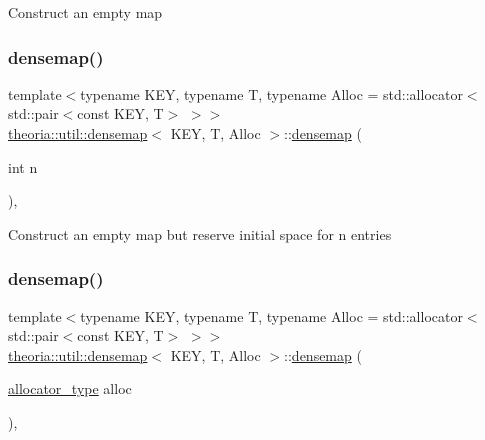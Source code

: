Construct an empty map \mbox{\label{classtheoria_1_1util_1_1densemap_a28dea7cc32d7cee72cf330bdf3e3201c}} 
\subsubsection{\texorpdfstring{densemap()}{densemap()}\hspace{0.1cm}{\footnotesize\ttfamily [2/7]}}
{\footnotesize\ttfamily template$<$typename K\+EY, typename T, typename Alloc = std\+::allocator$<$std\+::pair$<$const K\+E\+Y, T$>$ $>$$>$ \\
\hyperlink{classtheoria_1_1util_1_1densemap}{theoria\+::util\+::densemap}$<$ K\+EY, T, Alloc $>$\+::\hyperlink{classtheoria_1_1util_1_1densemap}{densemap} (\begin{DoxyParamCaption}\item[{int}]{n }\end{DoxyParamCaption})\hspace{0.3cm}{\ttfamily [inline]}, {\ttfamily [explicit]}}

Construct an empty map but reserve initial space for n entries \mbox{\label{classtheoria_1_1util_1_1densemap_a4c32897f404f44c7de730637d09e18d5}} 
\subsubsection{\texorpdfstring{densemap()}{densemap()}\hspace{0.1cm}{\footnotesize\ttfamily [3/7]}}
{\footnotesize\ttfamily template$<$typename K\+EY, typename T, typename Alloc = std\+::allocator$<$std\+::pair$<$const K\+E\+Y, T$>$ $>$$>$ \\
\hyperlink{classtheoria_1_1util_1_1densemap}{theoria\+::util\+::densemap}$<$ K\+EY, T, Alloc $>$\+::\hyperlink{classtheoria_1_1util_1_1densemap}{densemap} (\begin{DoxyParamCaption}\item[{\hyperlink{classtheoria_1_1util_1_1densemap_ae12f4688e504c8759e23759ad7272c94}{allocator\+\_\+type}}]{alloc }\end{DoxyParamCaption})\hspace{0.3cm}{\ttfamily [inline]}, {\ttfamily [explicit]}}

